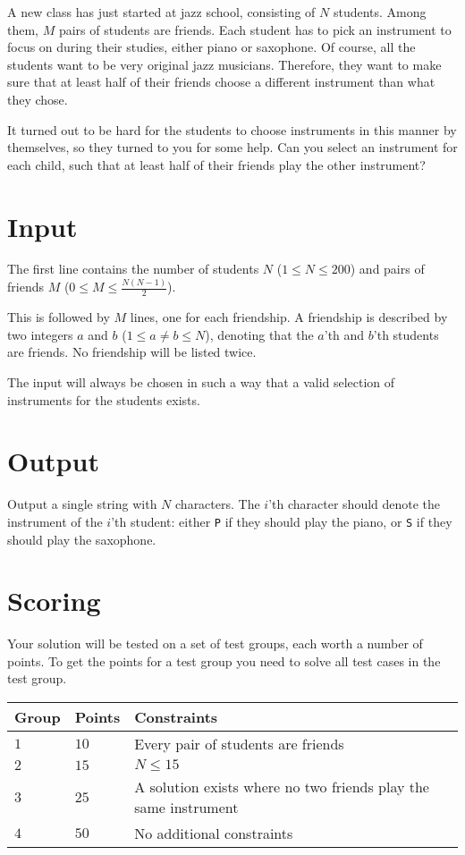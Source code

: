 A new class has just started at jazz school, consisting of $N$ students.
Among them, $M$ pairs of students are friends.
Each student has to pick an instrument to focus on during their studies, either piano or saxophone.
Of course, all the students want to be very original jazz musicians.
Therefore, they want to make sure that at least half of their friends choose a different instrument than what they chose.

It turned out to be hard for the students to choose instruments in this manner by themselves, so they turned to you for some help.
Can you select an instrument for each child, such that at least half of their friends play the other instrument?

\section*{Input}
The first line contains the number of students $N$ ($1 \le N \le 200$) and pairs of friends $M$ ($0 \le M \le \frac{N(N - 1)}{2}$).

This is followed by $M$ lines, one for each friendship.
A friendship is described by two integers $a$ and $b$ ($1 \le a \neq b \le N$), denoting that the $a$'th and $b$'th students are friends.
No friendship will be listed twice.

The input will always be chosen in such a way that a valid selection of instruments for the students exists.

\section*{Output}
Output a single string with $N$ characters.
The $i$'th character should denote the instrument of the $i$'th student: either \texttt{P} if they should play the piano, or \texttt{S} if they should play the saxophone.

\section*{Scoring}
Your solution will be tested on a set of test groups, each worth a number of points.
To get the points for a test group you need to solve all test cases in the test group.

\noindent
\begin{tabular}{| l | l | l |}
  \hline
  Group & Points & Constraints \\ \hline
  $1$    & $10$        &  Every pair of students are friends \\ \hline
  $2$    & $15$        &  $N \le 15$ \\ \hline
  $3$    & $25$        &  A solution exists where no two friends play the same instrument \\ \hline
  $4$    & $50$        &  No additional constraints \\ \hline
\end{tabular}

